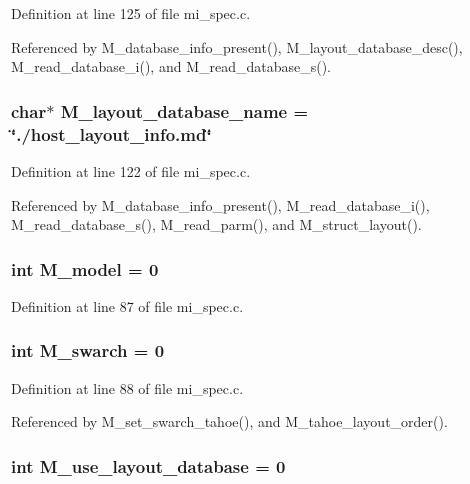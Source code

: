 Definition at line 125 of file mi\_\-spec.c.

Referenced by M\_\-database\_\-info\_\-present(), M\_\-layout\_\-database\_\-desc(), M\_\-read\_\-database\_\-i(), and M\_\-read\_\-database\_\-s().
\subsubsection{\setlength{\rightskip}{0pt plus 5cm}char$\ast$ \bf{M\_\-layout\_\-database\_\-name} = \char`\"{}./host\_\-layout\_\-info.md\char`\"{}}\label{mi__spec_8c_987ac68163669d5fcd111ec0a848e5cd}




Definition at line 122 of file mi\_\-spec.c.

Referenced by M\_\-database\_\-info\_\-present(), M\_\-read\_\-database\_\-i(), M\_\-read\_\-database\_\-s(), M\_\-read\_\-parm(), and M\_\-struct\_\-layout().
\subsubsection{\setlength{\rightskip}{0pt plus 5cm}int \bf{M\_\-model} = 0}\label{mi__spec_8c_0ff76fcfde2c71e202ea12dd9410bf65}




Definition at line 87 of file mi\_\-spec.c.
\subsubsection{\setlength{\rightskip}{0pt plus 5cm}int \bf{M\_\-swarch} = 0}\label{mi__spec_8c_383736f80767f9f15b4a1c30051ad5d3}




Definition at line 88 of file mi\_\-spec.c.

Referenced by M\_\-set\_\-swarch\_\-tahoe(), and M\_\-tahoe\_\-layout\_\-order().
\subsubsection{\setlength{\rightskip}{0pt plus 5cm}int \bf{M\_\-use\_\-layout\_\-database} = 0}\label{mi__spec_8c_f7153def0e1996515f36efbbe183ee4c}




